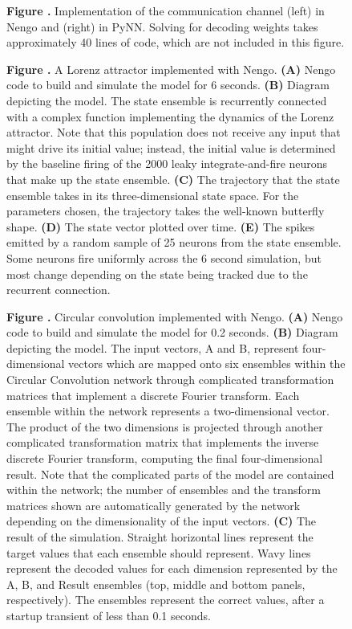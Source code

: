 \documentclass{frontiersSCNS}
\begin{document}
\begin{figure}
 \textbf{\label{fig:pynn} Figure
   .}{
   Implementation of the communication channel (left) in Nengo
   and (right) in PyNN. Solving for decoding weights
   takes approximately 40 lines of code,
   which are not included in this figure.}
\end{figure}

\begin{figure}
 \textbf{\label{fig:lorenz} Figure .}{
   A Lorenz attractor implemented with Nengo.
   \textbf{(A)} Nengo code to build and simulate the model
   for 6 seconds.
   \textbf{(B)} Diagram depicting the model. The state ensemble
   is recurrently connected with a complex function
   implementing the dynamics of the Lorenz attractor.
   Note that this population does not receive
   any input that might drive its initial value;
   instead, the initial value is determined by
   the baseline firing of the 2000 leaky integrate-and-fire
   neurons that make up the state ensemble.
   \textbf{(C)} The trajectory that the state ensemble takes
   in its three-dimensional state space.
   For the parameters chosen, the trajectory takes
   the well-known butterfly shape.
   \textbf{(D)} The state vector plotted over time.
   \textbf{(E)} The spikes emitted by a random sample of 25
   neurons from the state ensemble.
   Some neurons fire uniformly across the 6 second simulation,
   but most change depending on the state being tracked
   due to the recurrent connection.}
\end{figure}

\begin{figure}
 \textbf{\label{fig:cconv} Figure
   .}{
   Circular convolution implemented with Nengo.
   \textbf{(A)} Nengo code to build and simulate the model
   for 0.2 seconds.
   \textbf{(B)} Diagram depicting the model.
   The input vectors, A and B, represent four-dimensional vectors
   which are mapped onto six ensembles within the
   Circular Convolution network through
   complicated transformation matrices
   that implement a discrete Fourier transform.
   Each ensemble within the network represents a
   two-dimensional vector. The product of the two dimensions
   is projected through another complicated transformation matrix
   that implements the inverse discrete Fourier transform,
   computing the final four-dimensional result.
   Note that the complicated parts of the model
   are contained within the network;
   the number of ensembles and the transform matrices shown
   are automatically generated by the network depending on
   the dimensionality of the input vectors.
   \textbf{(C)} The result of the simulation.
   Straight horizontal lines represent
   the target values that each ensemble
   should represent.
   Wavy lines represent the decoded values
   for each dimension represented by the
   A, B, and Result ensembles
   (top, middle and bottom panels, respectively).
   The ensembles represent the correct values,
   after a startup transient of less than 0.1 seconds.}
\end{figure}
\end{document}
